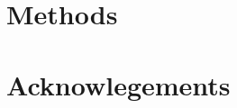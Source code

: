 \section{Methods}
{\footnotesize

}

\section{Acknowlegements}





\onecolumngrid

\pagebreak
\FloatBarrier

\beginsupplement
\setcounter{secnumdepth}{4}
\section{}


\pagebreak


\pagebreak




